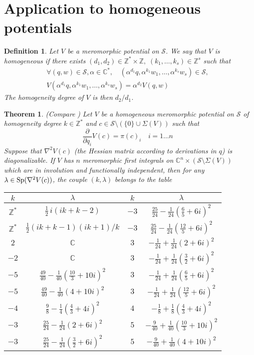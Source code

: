 \documentclass[smallcondensed]{svjour3}
\newtheorem{thm}{Theorem}
\newtheorem{defi}{Definition}
\begin{document}
\section{Application to homogeneous potentials}


\begin{defi}
Let $V$ be a meromorphic potential on $\mathcal{S}$. We say that $V$ is homogeneous if there exists $(d_1,d_2)\in\mathbb{Z}^*\times\mathbb{Z},\;(k_1,\dots,k_s)\in\mathbb{Z}^s$ such that
\begin{align*}
\forall (q,w)\in \mathcal{S},\alpha\in\mathbb{C}^*,\quad (\alpha^{d_1} q,\alpha^{k_1} w_1,\dots,\alpha^{k_s}w_s)\in\mathcal{S},\\
V(\alpha^{d_1} q,\alpha^{k_1} w_1,\dots,\alpha^{k_s}w_s)=\alpha^{d_2} V(q,w)
\end{align*}
The homogeneity degree of $V$ is then $d_2/d_1$.
\end{defi}

\begin{thm}\label{thmmorales2} (Compare \cite{22})
Let $V$ be a homogeneous meromorphic potential on $\mathcal{S}$ of homogeneity degree $k\in\mathbb{Z}^*$ and $c\in\mathcal{S}\setminus (\{0\}\cup \Sigma(V))$ such that
$$\frac{\partial}{\partial q_i} V(c)= \pi(c)_i\quad i=1\dots n$$
Suppose that $\nabla^2V(c)$ (the Hessian matrix according to derivations in $q$) is diagonalizable. If $V$ has $n$ meromorphic first integrals on $\mathbb{C}^n\times (\mathcal{S}\setminus \Sigma(V))$ which are in involution and functionally independent, then for any $\lambda\in \hbox{Sp}(\nabla^2 V(c))$, the couple $(k,\lambda)$ belongs to the table
\begin{center}\begin{tabular}{|c|c|c|c|}
\hline
$k$&$\lambda$&$k$&$\lambda$\\\hline
$\mathbb{Z}^*$&$\frac{1}{2}\,i \left( ik+k-2 \right)$&$-3$&$\frac{25}{24}-\frac{1}{24}(\frac{6}{5}+6 i)^2$ \\\hline
$\mathbb{Z}^*$&$\frac{1}{2}\left( ik+k-1 \right)  \left( ik+1 \right)/k$&$-3$&$\frac{25}{24}-\frac{1}{24}(\frac{12}{5}+6 i)^2$ \\\hline
$2$&$\mathbb{C}$&$3$&$-\frac{1}{24}+\frac{1}{24}(2+6 i)^2$ \\\hline
$-2$&$\mathbb{C}$&$3$&$-\frac{1}{24}+\frac{1}{24}(\frac{3}{2}+6 i)^2$ \\\hline
$-5$&$\frac{49}{40}-\frac{1}{40}(\frac{10}{3}+10 i)^2$&$3$&$-\frac{1}{24}+\frac{1}{24}(\frac{6}{5}+6 i)^2$ \\\hline
$-5$&$\frac{49}{40}-\frac{1}{40}(4+10 i)^2$&$3$&$-\frac{1}{24}+\frac{1}{24}(\frac{12}{5}+6 i)^2$ \\\hline
$-4$&$\frac{9}{8}-\frac{1}{4}(\frac{4}{3}+4i)^2$&$4$&$-\frac{1}{8}+\frac{1}{8}(\frac{4}{3}+4 i)^2$ \\\hline
$-3$&$\frac{25}{24}-\frac{1}{24}(2+6 i)^2$&$5$&$-\frac{9}{40}+\frac{1}{40}(\frac{10}{3}+10 i)^2$ \\\hline
$-3$&$\frac{25}{24}-\frac{1}{24}(\frac{3}{2}+6 i)^2$&$5$&$-\frac{9}{40}+\frac{1}{40}(4+10 i)^2$ \\\hline
\end{tabular}\end{center}
\end{thm}
\end{document}
